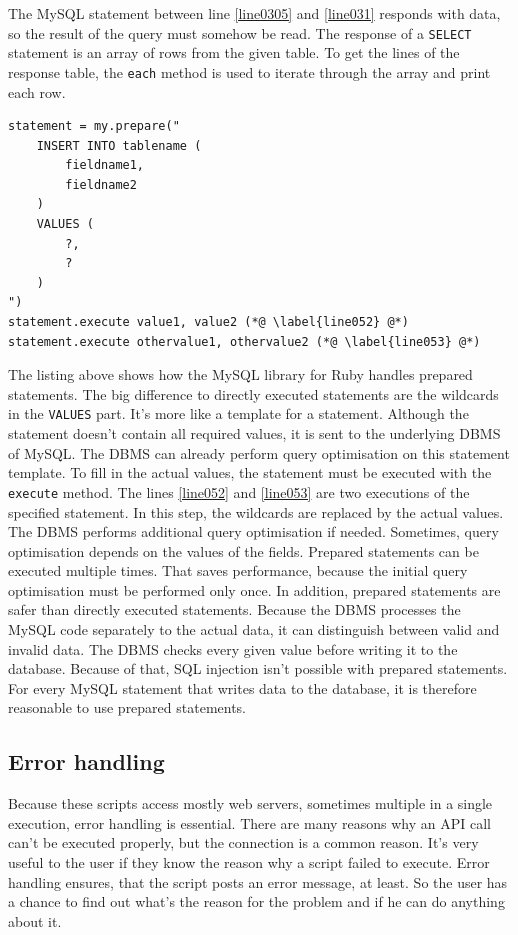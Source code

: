 The MySQL statement between line \ref{line0305} and \ref{line031} responds with data, so the result of the query must somehow be read. The response of a \lstinline{SELECT} statement is an array of rows from the given table. To get the lines of the response table, the \lstinline{each} method is used to iterate through the array and print each row.

\begin{lstlisting}[aboveskip=1\baselineskip, caption=\texttt{joomlaMultiple.rb} usage., label=listing029]
statement = my.prepare("
	INSERT INTO tablename (
		fieldname1,
		fieldname2
	) 
	VALUES (
		?,
		?
	)
")
statement.execute value1, value2 (*@ \label{line052} @*)
statement.execute othervalue1, othervalue2 (*@ \label{line053} @*)
\end{lstlisting}

The listing above shows how the MySQL library for Ruby handles prepared statements. The big difference to directly executed statements are the wildcards in the \lstinline{VALUES} part. It's more like a template for a statement. Although the statement doesn't contain all required values, it is sent to the underlying DBMS of MySQL. The DBMS can already perform query optimisation on this statement template. To fill in the actual values, the statement must be executed with the \lstinline{execute} method. The lines \ref{line052} and \ref{line053} are two executions of the specified statement. In this step, the wildcards are replaced by the actual values. The DBMS performs additional query optimisation if needed. Sometimes, query optimisation depends on the values of the fields. Prepared statements can be executed multiple times. That saves performance, because the initial query optimisation must be performed only once. In addition, prepared statements are safer than directly executed statements. Because the DBMS processes the MySQL code separately to the actual data, it can distinguish between valid and invalid data. The DBMS checks every given value before writing it to the database. Because of that, SQL injection isn't possible with prepared statements. For every MySQL statement that writes data to the database, it is therefore reasonable to use prepared statements. \cite{mysql:rubydoc}

\subsection{Error handling}
Because these scripts access mostly web servers, sometimes multiple in a single execution, error handling is essential. There are many reasons why an API call can't be executed properly, but the connection is a common reason. It's very useful to the user if  they know the reason why a script failed to execute. Error handling ensures, that the script posts an error message, at least. So the user has a chance to find out what's the reason for the problem and if he can do anything about it.

